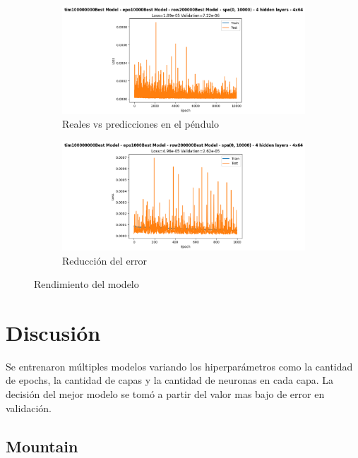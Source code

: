 \documentclass[a4paper,12pt]{article}
\begin{document}
\begin{figure}[H]
    \centering
    \begin{subfigure}{.7\linewidth}
        \centering
        \includegraphics[width=\textwidth]{true_vs_prediction_pendulum.png}
        \caption{Reales vs predicciones en el péndulo}
        \label{fig:true_vs_prediction_pendulum}
    \end{subfigure}
    \begin{subfigure}{.7\linewidth}
        \centering
        \includegraphics[width=\textwidth]{loss.png}
        \caption{Reducción del error}
        \label{fig:loss}
    \end{subfigure}
    \caption{Rendimiento del modelo}
\end{figure}

\section{Discusión}
Se entrenaron múltiples modelos variando los hiperparámetros como la cantidad de epochs, la cantidad de capas y la cantidad de neuronas en cada capa. La decisión del mejor modelo se tomó a partir del valor mas bajo de error en validación.

\subsection*{Mountain}

\end{document}
